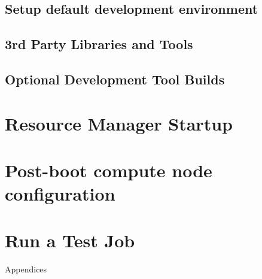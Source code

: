 \documentclass[letterpaper]{article}
\begin{document}
\subsection{Setup default development environment}


\subsection{3rd Party Libraries and Tools} \label{sec:3rdparty}



\vspace*{0.1cm}


\subsection{Optional Development Tool Builds} \label{sec:3rdparty_intel}


\clearpage
\section{Resource Manager Startup} \label{sec:rms_startup}


\section{Post-boot compute node configuration} \label{sec:post_boot}


\section{Run a Test Job} \label{sec:test_job}


\clearpage
\appendix
{\bf \LARGE \centerline{Appendices}} \vspace*{0.2cm}

\renewcommand{\thesubsection}{\Alph{subsection}}







\end{document}
